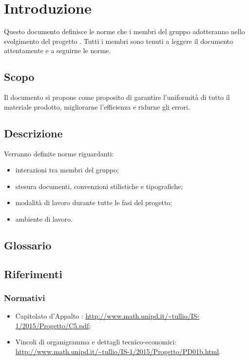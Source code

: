 \documentclass[12pt,a4paper]{article}
\begin{document}
\newpage
\tableofcontents
\newpage
\listoftables
\listoffigures
\newpage

\section{Introduzione}
Questo documento definisce le norme che i membri del gruppo \nomeGruppo{} adotteranno nello svolgimento del progetto \prjL. Tutti i membri sono tenuti a leggere il documento attentamente e a seguirne le norme.

\subsection{Scopo}
Il documento si propone come proposito di garantire l'uniformità di tutto il materiale prodotto, migliorarne l'efficienza e ridurne gli errori.

\subsection{Descrizione}
Verranno definite norme riguardanti:
\begin{itemize}
	\item interazioni tra membri del gruppo;
	\item stesura documenti, convenzioni stilistiche e tipografiche;
	\item modalità di lavoro durante tutte le fasi del progetto;
	\item ambiente di lavoro.
\end{itemize}

\subsection{Glossario}\label{glossario}
\glossarioPrint

\subsection{Riferimenti}\label{riferimenti}

\subsubsection{Normativi}
\begin{itemize}
	\item Capitolato d’Appalto \prjL: \url{http://www.math.unipd.it/~tullio/IS-1/2015/Progetto/C5.pdf};
	\item Vincoli di organigramma e dettagli tecnico-economici: \url{http://www.math.unipd.it/~tullio/IS-1/2015/Progetto/PD01b.html}.
\end{itemize}
\end{document}
